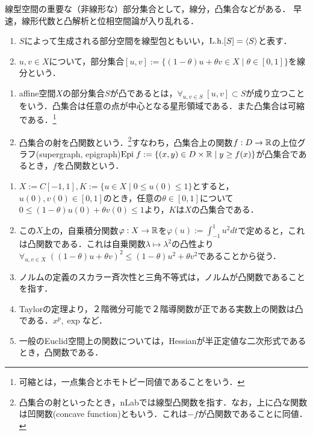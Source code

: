 \documentclass[uplatex, dvipdfmx]{jsreport}
\begin{document}
\begin{tcolorbox}[colframe=ForestGreen, colback=ForestGreen!10!white,breakable,colbacktitle=ForestGreen!40!white,coltitle=black,fonttitle=\bfseries\sffamily,
title=]
    線型空間の重要な（非線形な）部分集合として，線分，凸集合などがある．
    早速，線形代数と凸解析と位相空間論が入り乱れる．
\end{tcolorbox}

\begin{definition}\mbox{}
    \begin{enumerate}
        \item $S$によって生成される部分空間を線型包ともいい，$\mathrm{L.h.}[S]=\langle S\rangle$と表す．
        \item $u,v\in X$について，部分集合$[u,v]:=\{(1-\theta)u+\theta v\in X\mid \theta\in[0,1]\}$を線分という．
    \end{enumerate}
\end{definition}

\begin{definition}\mbox{}
    \begin{enumerate}
        \item affine空間$X$の部分集合$S$が凸であるとは，$\forall_{u,v\in S}\;[u,v]\subset S$が成り立つことをいう．凸集合は任意の点が中心となる星形領域である．また凸集合は可縮である．\footnote{可縮とは，一点集合とホモトピー同値であることをいう．}
        \item 凸集合の射を凸関数という．\footnote{凸集合の射といったとき，nLabでは線型凸関数を指す．なお，上に凸な関数は凹関数(concave function)ともいう．これは$-f$が凸関数であることに同値．}すなわち，凸集合上の関数$f:D\to\mathbb{R}$の上位グラフ(supergraph, epigraph)$\mathrm{Epi}\; f:=\{(x,y)\in D\times\mathbb{R}\mid y\ge f(x)\}$が凸集合であるとき，$f$を凸関数という．
    \end{enumerate}
\end{definition}

\begin{example}\mbox{}
    \begin{enumerate}
        \item $X:=C[-1,1],K:=\{u\in X\mid 0\le u(0)\le 1\}$とすると，$u(0),v(0)\in[0,1]$のとき，任意の$\theta\in[0,1]$について$0\le (1-\theta)u(0)+\theta v(0)\le 1$より，$K$は$X$の凸集合である．
        \item この$X$上の，自乗積分関数$\varphi:X\to\mathbb{R}$を$\varphi(u):=\int^1_{-1}u^2dt$で定めると，これは凸関数である．これは自乗関数$\lambda\mapsto\lambda^2$の凸性より$\forall_{u,v\in X}\;((1-\theta)u+\theta v)^2\le(1-\theta)u^2+\theta v^2$であることから従う．
        \item ノルムの定義のスカラー斉次性と三角不等式は，ノルムが凸関数であることを指す．
        \item Taylorの定理より，２階微分可能で２階導関数が正である実数上の関数は凸である．$x^p,\exp$など．
        \item 一般のEuclid空間上の関数については，Hessianが半正定値な二次形式であるとき，凸関数である．
    \end{enumerate}
\end{example}
\end{document}
